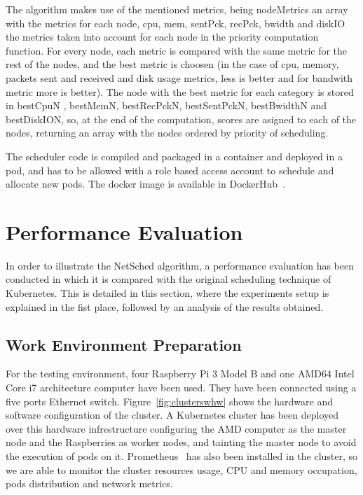 \documentclass[conference]{IEEEtran}
\begin{document}
The algorithm makes use of the mentioned metrics, being nodeMetrics an array with the metrics for each node, cpu, mem, sentPck, recPck, bwidth and diskIO
the metrics taken into account for each node in the priority computation function. For every node, each metric is compared with the same metric for the rest of the nodes, and the
best metric is choosen (in the case of cpu, memory, packets sent and received and disk usage metrics, less is better and for bandwith metric more is better). The node with the best
metric for each category is stored in bestCpuN , bestMemN, bestRecPckN, bestSentPckN, bestBwidthN and bestDiskION, so, at the end of the computation, scores are asigned to each of
the nodes, returning an array with the nodes ordered by priority of scheduling.

The scheduler code is compiled and packaged in a container and deployed in a pod, and has to be allowed with a role based access account to schedule
and allocate new pods. The docker image is available in DockerHub~\cite{dockerhub}.


\section{Performance Evaluation}\label{sec:eval}

In order to illustrate the NetSched algorithm, a performance evaluation has been conducted in which it is compared with the original scheduling technique of Kubernetes. This is detailed in this section, where the experiments setup is explained in the fist place, followed by an analysis of the results obtained. 


\subsection{Work Environment Preparation}\label{sec:env}

For the testing environment, four Raspberry Pi 3 Model B and one AMD64 Intel Core i7 architecture computer have been used. They have been connected using a five ports Ethernet switch. Figure~\ref{fig:clusterswhw} shows the hardware and software configuration of the cluster. %
A Kubernetes cluster has been deployed over this hardware infrestructure configuring the AMD computer as the master node and
the Raspberries as worker nodes, and tainting the master node to avoid the execution of pods on it. Prometheus~\cite{prometheus}
has also been installed in the cluster, so we are able to monitor the cluster resources usage, CPU and memory occupation, pods distribution and network metrics.
\end{document}
